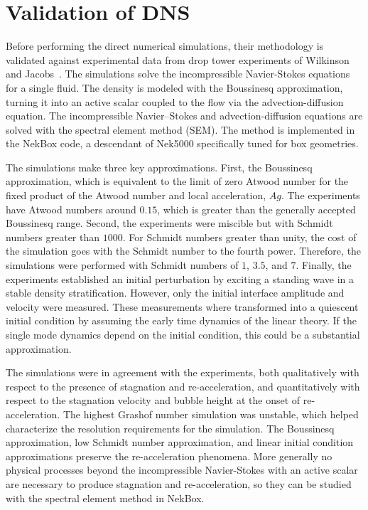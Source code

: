 \section{Validation of DNS}
Before performing the direct numerical simulations, their methodology is validated against experimental data from drop tower experiments of Wilkinson and Jacobs~\cite{Wilkinson2007}.
The simulations solve the incompressible Navier-Stokes equations for a single fluid.
The density is modeled with the Boussinesq approximation, turning it into an active scalar coupled to the flow via the advection-diffusion equation.
The incompressible Navier--Stokes and advection-diffusion equations are solved with the spectral element method (SEM).
The method is implemented in the NekBox code, a descendant of Nek5000 specifically tuned for box geometries.

The simulations make three key approximations.
First, the Boussinesq approximation, which is equivalent to the limit of zero Atwood number for the fixed product of the Atwood number and local acceleration, $Ag$.
The experiments have Atwood numbers around $0.15$, which is greater than the generally accepted Boussinesq range.
Second, the experiments were miscible but with Schmidt numbers greater than $1000$.
For Schmidt numbers greater than unity, the cost of the simulation goes with the Schmidt number to the fourth power.
Therefore, the simulations were performed with Schmidt numbers of $1$, $3.5$, and $7$.
Finally, the experiments established an initial perturbation by exciting a standing wave in a stable density stratification.
However, only the initial interface amplitude and velocity were measured.
These measurements where transformed into a quiescent initial condition by assuming the early time dynamics of the linear theory.
If the single mode dynamics depend on the initial condition, this could be a substantial approximation.

The simulations were in agreement with the experiments, both qualitatively with respect to the presence of stagnation and re-acceleration, and quantitatively with respect to the stagnation velocity and bubble height at the onset of re-acceleration.
The highest Grashof number simulation was unstable, which helped characterize the resolution requirements for the simulation.
The Boussinesq approximation, low Schmidt number approximation, and linear initial condition approximations preserve the re-acceleration phenomena.
More generally no physical processes beyond the incompressible Navier-Stokes with an active scalar are necessary to produce stagnation and re-acceleration, so they can be studied with the spectral element method in NekBox.

